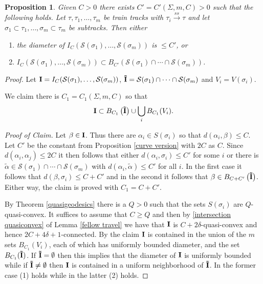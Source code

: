 \documentclass[11pt]{article}
\newtheorem{prop}[thm]{Proposition}
\theoremstyle{remark}
\def\S{{\mathcal S}}
\def\ss{{\overset{ss}\longrightarrow}}
\begin{document}
\begin{prop}\label{alternative}
  Given $C>0$ there exists $C' = C'(\Sigma, m, C)>0$
  such that the following holds. Let $\tau, \tau_1, \dots, \tau_m$ be train tracks with $\tau_i \ss \tau$ and let $\sigma_1 \subset \tau_1, \dots, \sigma_m \subset \tau_m$ be subtracks. Then either
\begin{enumerate}[(1)]
\item the diameter of $I_C(\S(\sigma_1), \dots, \S(\sigma_m))$ is $\le C'$, or
\item $I_C(\S(\sigma_1), \dots, \S(\sigma_m)) \subset B_{C'}(\S(\sigma_1) \cap \cdots \cap\S(\sigma_m))$.
\end{enumerate}
\end{prop}

\begin{proof}
Let ${\bf I} = I_C(\S(\sigma_1), \dots, \S(\sigma_m))$, ${\bf \tilde I} =  \S(\sigma_1) \cap \cdots \cap \S(\sigma_m)$ and $V_i = V(\sigma_i)$.

  We claim there is $C_1=C_1(\Sigma,m,C)$ so
  that $${\bf I} \subset B_{C_1}\left({\bf \tilde I}\right) \cup \bigcup_i B_{C_1}(V_i).$$


  {\it Proof of Claim.} Let $\beta\in {\bf I}$.
Thus there are $\alpha_i\in S(\sigma_i)$ so that
  $d(\alpha_i,\beta)\leq C$. Let $C'$ be the constant from Proposition
  \ref{curve version} with $2C$ as $C$. Since $d(\alpha_i,\alpha_j)\leq
  2C$ it then follows that either
  $d(\alpha_i,\sigma_i)\leq C'$ for some $i$
  or there is $\tilde\alpha\in
  \S(\sigma_1) \cap \cdots \cap\S(\sigma_m)$ with
  $d(\alpha_i,\tilde\alpha)\leq C'$ for all $i$.
  In the first case it follows that
  $d(\beta,\sigma_i)\leq C+C'$ and in the second it follows that
  $\beta\in B_{C+C'}\left({\bf \tilde I}\right)$.
  Either way, the claim is proved with $C_1=C+C'$.

By Theorem \ref{quasigeodesics} there is a $Q>0$ such that the sets $S(\sigma_i)$ are $Q$-quasi-convex. It suffices to assume that $C \ge Q$ and then by \eqref{intersection quasiconvex} of  Lemma \ref{fellow travel} we have that ${\bf I}$ is $C+2\delta$-quasi-convex and hence $2C+4\delta + 1$-connected. By the claim ${\bf I}$ is contained in the union of the $m$ sets $B_{C_1}(V_i)$, each of which has uniformly bounded diameter, and the set  $B_{C_1}({\bf \tilde I})$. If ${\bf \tilde I} = \emptyset$ then this implies that the diameter of ${\bf I}$ is uniformly bounded while if ${\bf \tilde I} \neq \emptyset$ then ${\bf I}$ is contained in a uniform neighborhood of ${\bf \tilde I}$. In the former case (1) holds while in the latter (2) holds.
\end{proof}
\end{document}
